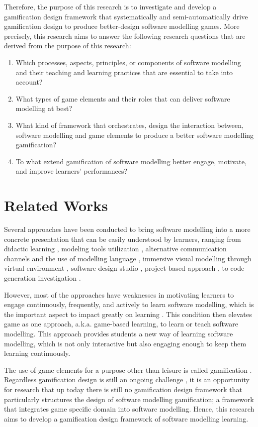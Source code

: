 \documentclass[runningheads,a4paper]{llncs}
\begin{document}
Therefore, the purpose of this research is to investigate and develop a gamification design framework that systematically and semi-automatically drive gamification design to produce better-design software modelling games. More precisely, this research aims to answer the following research questions that are derived from the purpose of this research:
\begin{enumerate}
\item Which processes, aspects, principles, or components of software modelling and their teaching and learning practices that are essential to take into account?
\item What types of game elements and their roles that can deliver software modelling at best? 
\item What kind of framework that orchestrates, design the interaction between, software modelling and game elements to produce a better software modelling gamification?
\item To what extend gamification of software modelling better engage, motivate, and improve learners’ performances?
\end{enumerate}

\section{Related Works}
Several approaches have been conducted to bring software modelling into a more concrete presentation that can be easily understood by learners, ranging from didactic learning \cite{moisan2009teaching}, modeling tools utilization \cite{Akayama2013}, alternative communication channels and the use of modelling language \cite{Brandsteidl2011}, immersive visual modelling through virtual environment \cite{neubauer2003immersive}, software design studio \cite{Whittle2014}, project-based approach \cite{Szmurlo2007}, to code generation investigation \cite{schmidt2014teaching}.

However, most of the approaches have weaknesses in motivating learners to engage continuously, frequently, and actively to learn software modelling, which is the important aspect to impact greatly on learning \cite{Naps2005}. This condition then elevates game as one approach, a.k.a. game-based learning, to learn or teach software modelling. This approach provides students a new way of learning software modelling, which is not only interactive but also engaging enough to keep them learning continuously. 

The use of game elements for a purpose other than leisure is called gamification \cite{deterding2011game}. Regardless gamification design is still an ongoing challenge \cite{Deterding2013}, it is an opportunity for research that up today there is still no gamification design framework that particularly structures the design of software modelling gamification; a framework that integrates game specific domain into software modelling. Hence, this research aims to develop a gamification design framework of software modelling learning.
\end{document}
